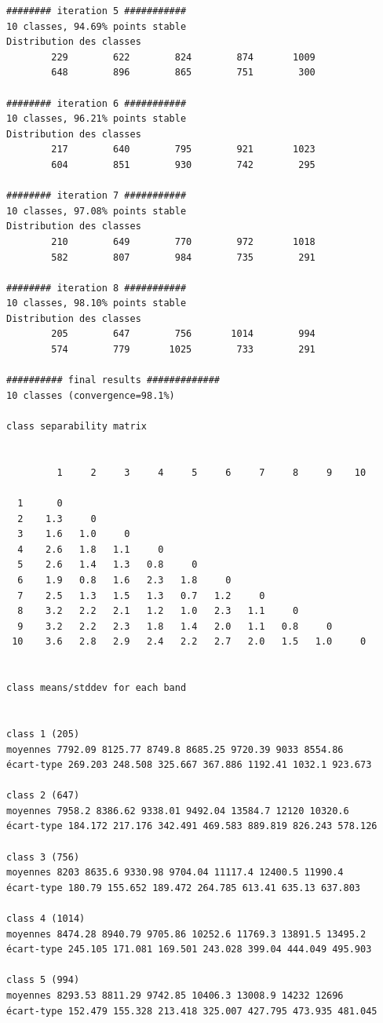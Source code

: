 \documentclass[analytics,article,accept,pdftex,moreauthors]{Definitions/mdpi}
\begin{document}
\begin{footnotesize}
\begin{verbatim}
######## iteration 5 ###########
10 classes, 94.69% points stable
Distribution des classes
        229        622        824        874       1009
        648        896        865        751        300

######## iteration 6 ###########
10 classes, 96.21% points stable
Distribution des classes
        217        640        795        921       1023
        604        851        930        742        295

######## iteration 7 ###########
10 classes, 97.08% points stable
Distribution des classes
        210        649        770        972       1018
        582        807        984        735        291

######## iteration 8 ###########
10 classes, 98.10% points stable
Distribution des classes
        205        647        756       1014        994
        574        779       1025        733        291

########## final results #############
10 classes (convergence=98.1%)

class separability matrix


         1     2     3     4     5     6     7     8     9    10

  1      0
  2    1.3     0
  3    1.6   1.0     0
  4    2.6   1.8   1.1     0
  5    2.6   1.4   1.3   0.8     0
  6    1.9   0.8   1.6   2.3   1.8     0
  7    2.5   1.3   1.5   1.3   0.7   1.2     0
  8    3.2   2.2   2.1   1.2   1.0   2.3   1.1     0
  9    3.2   2.2   2.3   1.8   1.4   2.0   1.1   0.8     0
 10    3.6   2.8   2.9   2.4   2.2   2.7   2.0   1.5   1.0     0


class means/stddev for each band


class 1 (205)
moyennes 7792.09 8125.77 8749.8 8685.25 9720.39 9033 8554.86
écart-type 269.203 248.508 325.667 367.886 1192.41 1032.1 923.673

class 2 (647)
moyennes 7958.2 8386.62 9338.01 9492.04 13584.7 12120 10320.6
écart-type 184.172 217.176 342.491 469.583 889.819 826.243 578.126

class 3 (756)
moyennes 8203 8635.6 9330.98 9704.04 11117.4 12400.5 11990.4
écart-type 180.79 155.652 189.472 264.785 613.41 635.13 637.803

class 4 (1014)
moyennes 8474.28 8940.79 9705.86 10252.6 11769.3 13891.5 13495.2
écart-type 245.105 171.081 169.501 243.028 399.04 444.049 495.903

class 5 (994)
moyennes 8293.53 8811.29 9742.85 10406.3 13008.9 14232 12696
écart-type 152.479 155.328 213.418 325.007 427.795 473.935 481.045


\end{verbatim}
\end{footnotesize}
\end{document}
